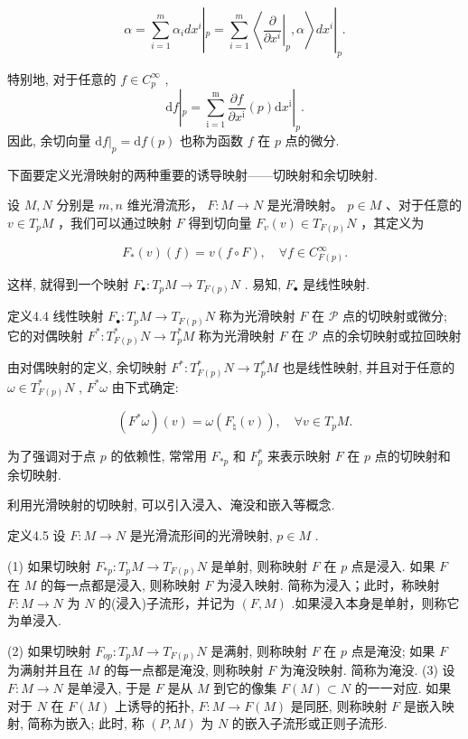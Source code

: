 $$
\alpha = \sum_ {i = 1} ^ {m} \alpha_ {i} d x ^ {i} | _ {p} = \sum_ {i = 1} ^ {m} \left\langle \left. \frac {\partial}{\partial x ^ {i}} \right| _ {p}, \alpha \right\rangle d x ^ {i} | _ {p}.
$$

特别地, 对于任意的  $f \in C_{p}^{\infty}$ ,
$$
\mathrm {d} f | _ {p} = \sum_ {\mathrm {i} = 1} ^ {\mathrm {m}} \frac {\partial f}{\partial x ^ {\mathrm {i}}} (p) \mathrm {d} x ^ {\mathrm {i}} | _ {p}.
$$
因此, 余切向量  $\mathrm{d}f|_{p} = \mathrm{d}f(p)$  也称为函数  $f$  在  $p$  点的微分.

下面要定义光滑映射的两种重要的诱导映射——切映射和余切映射.

设  $M, N$  分别是  $m, n$  维光滑流形， $F: M \to N$  是光滑映射。 $p \in M$ 、对于任意的  $v \in T_pM$ ，我们可以通过映射  $F$  得到切向量  $F_v(v) \in T_{F(p)}N$ ，其定义为

$$
F _ {*} (v) (f) = v (f \circ F), \quad \forall f \in C _ {F (p)} ^ {\infty}.
$$

这样, 就得到一个映射  $F_{\bullet}: T_pM \to T_{F(p)}N$ . 易知,  $F_{\bullet}$  是线性映射.

定义4.4 线性映射  $F_{\bullet}:T_{p}M\to T_{F(p)}N$  称为光滑映射  $F$  在  $\mathcal{P}$  点的切映射或微分; 它的对偶映射  $F^{*}:T_{F(p)}^{*}N\to T_{p}^{*}M$  称为光滑映射 $F$  在  $\mathcal{P}$  点的余切映射或拉回映射

由对偶映射的定义, 余切映射  $F^{*}: T_{F(p)}^{*}N \to T_{p}^{*}M$  也是线性映射, 并且对于任意的  $\omega \in T_{F(p)}^{*}N$ ,  $F^{*}\omega$  由下式确定:

$$
(F ^ {*} \omega) (v) = \omega \left(F _ {\natural} (v)\right), \quad \forall v \in T _ {p} M.
$$

为了强调对于点  $p$  的依赖性, 常常用  $F_{*p}$  和  $F_{p}^{*}$  来表示映射  $F$  在  $p$  点的切映射和余切映射.

利用光滑映射的切映射, 可以引入浸入、淹没和嵌入等概念.

定义4.5 设  $F: M \to N$  是光滑流形间的光滑映射,  $p \in M$ .

(1) 如果切映射  $F_{*p}: T_pM \to T_{F(p)}N$  是单射, 则称映射  $F$  在  $p$  点是浸入. 如果  $F$  在  $M$  的每一点都是浸入, 则称映射  $F$  为浸入映射.
简称为浸入；此时，称映射  $F:M\to N$  为  $N$  的(浸入)子流形，并记为 $(F,M)$  .如果浸入本身是单射，则称它为单浸入.

(2) 如果切映射  $F_{op}: T_pM \to T_{F(p)}N$  是满射, 则称映射  $F$  在  $p$  点是淹没; 如果  $F$  为满射并且在  $M$  的每一点都是淹没, 则称映射  $F$  为淹没映射. 简称为淹没.  
(3) 设  $F: M \to N$  是单浸入, 于是  $F$  是从  $M$  到它的像集  $F(M) \subset N$  的一一对应. 如果对于  $N$  在  $F(M)$  上诱导的拓扑,  $F: M \to F(M)$  是同胚, 则称映射  $F$  是嵌入映射, 简称为嵌入; 此时, 称  $(P, M)$  为  $N$  的嵌入子流形或正则子流形.

